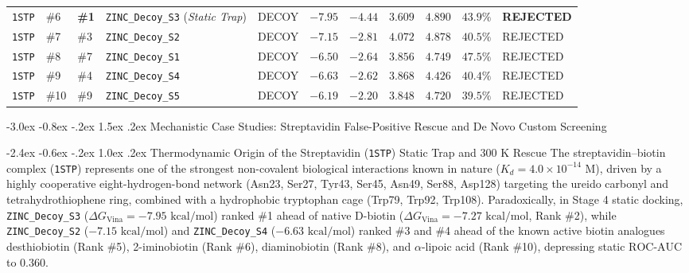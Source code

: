 \documentclass[11pt,a4paper]{article}
\makeatletter
\renewcommand{\section}{\@startsection{section}{1}{\z@}%
  {-3.0ex \@plus -0.8ex \@minus -.2ex}%
  {1.5ex \@plus.2ex}%
  {\normalfont\Large\bfseries\color{primary}}}
\renewcommand{\subsection}{\@startsection{subsection}{2}{\z@}%
  {-2.4ex \@plus -0.6ex \@minus -.2ex}%
  {1.0ex \@plus .2ex}%
  {\normalfont\large\bfseries\color{primary}}}
\makeatother
\begin{document}
{\begin{longtable}{L{0.8cm} C{0.65cm} C{0.65cm} L{2.6cm} C{1.3cm} R{0.95cm} R{0.95cm} R{1.0cm} R{0.9cm} R{0.95cm} C{1.85cm}}
\texttt{1STP} & \#6 & \textbf{\#1} & \texttt{ZINC\_Decoy\_S3} (\textit{Static Trap}) & DECOY & $-7.95$ & $-4.44$ & $3.609$ & $4.890$ & $43.9\%$ & \textcolor{failred}{\textbf{REJECTED}} \\
\texttt{1STP} & \#7 & \#3 & \texttt{ZINC\_Decoy\_S2} & DECOY & $-7.15$ & $-2.81$ & $4.072$ & $4.878$ & $40.5\%$ & \textcolor{failred}{REJECTED} \\
\texttt{1STP} & \#8 & \#7 & \texttt{ZINC\_Decoy\_S1} & DECOY & $-6.50$ & $-2.64$ & $3.856$ & $4.749$ & $47.5\%$ & \textcolor{failred}{REJECTED} \\
\texttt{1STP} & \#9 & \#4 & \texttt{ZINC\_Decoy\_S4} & DECOY & $-6.63$ & $-2.62$ & $3.868$ & $4.426$ & $40.4\%$ & \textcolor{failred}{REJECTED} \\
\texttt{1STP} & \#10 & \#9 & \texttt{ZINC\_Decoy\_S5} & DECOY & $-6.19$ & $-2.20$ & $3.848$ & $4.720$ & $39.5\%$ & \textcolor{failred}{REJECTED} \\
\end{longtable}
}

\section{Mechanistic Case Studies: Streptavidin False-Positive Rescue and De Novo Custom Screening}

\subsection{Thermodynamic Origin of the Streptavidin (\texttt{1STP}) Static Trap and 300 K Rescue}
\noindent The streptavidin--biotin complex (\texttt{1STP}) represents one of the strongest non-covalent biological interactions known in nature ($K_d = 4.0\times 10^{-14}\text{ M}$), driven by a highly cooperative eight-hydrogen-bond network (Asn23, Ser27, Tyr43, Ser45, Asn49, Ser88, Asp128) targeting the ureido carbonyl and tetrahydrothiophene ring, combined with a hydrophobic tryptophan cage (Trp79, Trp92, Trp108). Paradoxically, in Stage 4 static docking, \texttt{ZINC\_Decoy\_S3} ($\Delta G_{\text{Vina}} = -7.95\text{ kcal/mol}$) ranked \#1 ahead of native D-biotin ($\Delta G_{\text{Vina}} = -7.27\text{ kcal/mol}$, Rank \#2), while \texttt{ZINC\_Decoy\_S2} ($-7.15\text{ kcal/mol}$) and \texttt{ZINC\_Decoy\_S4} ($-6.63\text{ kcal/mol}$) ranked \#3 and \#4 ahead of the known active biotin analogues desthiobiotin (Rank \#5), 2-iminobiotin (Rank \#6), diaminobiotin (Rank \#8), and $\alpha$-lipoic acid (Rank \#10), depressing static $\text{ROC-AUC}$ to $0.360$.
\end{document}
